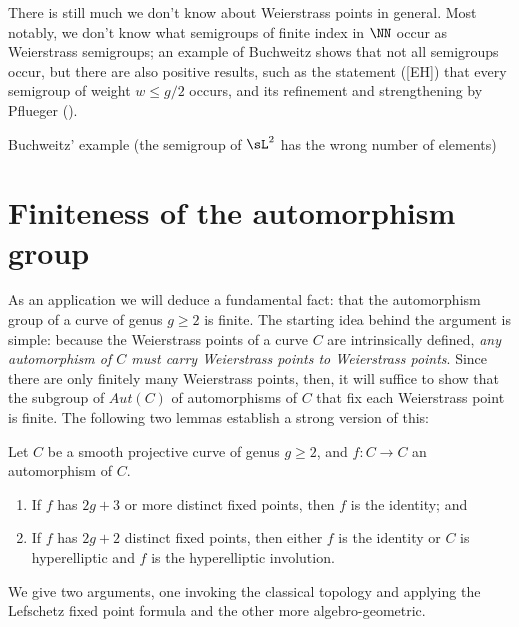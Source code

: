 There is still much we don't know about Weierstrass points in general. Most notably, we don't know what semigroups of finite index in $\NN$ occur as Weierstrass semigroups; an example of Buchweitz shows that not all semigroups occur, but there are also positive results, such as the statement ([EH]) that every semigroup of weight $w \leq g/2$ occurs, and its refinement and strengthening by Pflueger (\cite{**}).

\begin{exercise}
Buchweitz' example (the semigroup of $\sL^2$ has the wrong number of elements)
\end{exercise}

 



\section{Finiteness of the automorphism group}

As an application we will deduce a fundamental fact: that the automorphism group of a curve of genus $g\geq 2$ is finite. The starting idea behind the argument is simple: because the Weierstrass points of a curve $C$ are intrinsically defined, \emph{any automorphism of $C$ must carry Weierstrass points to Weierstrass points}. Since there are only finitely many Weierstrass points, then, it will suffice to show that the subgroup of $Aut(C)$ of automorphisms of $C$ that fix each  Weierstrass point is finite. The following two lemmas establish a strong version of this:

\begin{lemma}
Let $C$ be a smooth projective curve of genus $g \geq 2$, and $f: C \to C$ an automorphism of $C$.
\begin{enumerate}
\item If $f$ has $2g+3$ or more distinct fixed points, then $f$ is the identity; and
\item If $f$ has $2g+2$ distinct fixed points, then either $f$ is the identity or $C$ is hyperelliptic and $f$ is the hyperelliptic involution.
\end{enumerate}
\end{lemma}

We give two arguments, one invoking the classical topology and applying the Lefschetz fixed point formula and the other more algebro-geometric.

